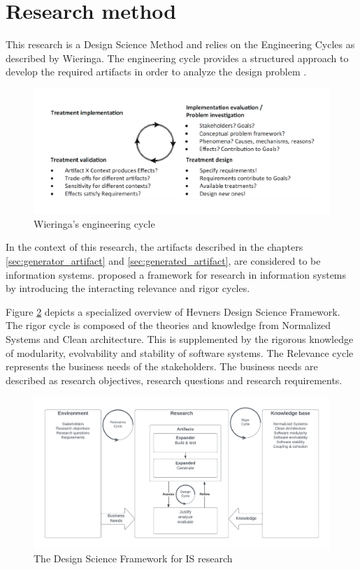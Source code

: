 \section{Research method} \label{sec:research_method}

This research is a Design Science Method and relies on the Engineering Cycles as described
by Wieringa. The engineering cycle provides a structured approach to develop the
required artifacts in order to analyze the design problem \parencite{wieringa_design_2014}.

\begin{figure}[H]
    \centering
    \includegraphics[width=1\textwidth]{Figures/engineering_cycle.pdf}
    \caption[Engineering cycle]{Wieringa's engineering cycle}
    \label{fig:engineering_cycle}
\end{figure}

In the context of this research, the artifacts described in the chapters
\ref{sec:generator_artifact} and \ref{sec:generated_artifact}, are considered to be
information systems. \citeauthor{hevner_design_nodate} proposed a framework for research
in information systems by introducing the interacting relevance and rigor cycles.

Figure \ref{fig:dsr} depicts a specialized overview of Hevners Design Science Framework.
The rigor cycle is composed of the theories and knowledge from Normalized Systems
and Clean architecture. This is supplemented by the rigorous knowledge of modularity,
evolvability and stability of software systems. The Relevance cycle represents the
business needs of the stakeholders. The business needs are described as research
objectives, research questions and research requirements.

\begin{figure}[H]
    \centering
    \includegraphics[width=1\textwidth]{Figures/rigor_relevance_cycle.pdf}
    \caption[DSF]{The Design Science Framework for IS research}
    \label{fig:dsr}
\end{figure}